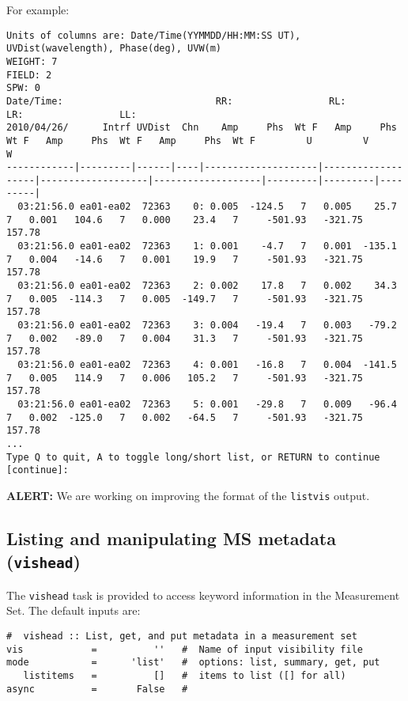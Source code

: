 For example:
\small
\begin{verbatim}
Units of columns are: Date/Time(YYMMDD/HH:MM:SS UT), UVDist(wavelength), Phase(deg), UVW(m)
WEIGHT: 7
FIELD: 2
SPW: 0
Date/Time:                           RR:                 RL:                 LR:                 LL:                                             
2010/04/26/      Intrf UVDist  Chn    Amp     Phs  Wt F   Amp     Phs  Wt F   Amp     Phs  Wt F   Amp     Phs  Wt F         U         V         W
------------|---------|------|----|--------------------|-------------------|-------------------|-------------------|---------|---------|---------|
  03:21:56.0 ea01-ea02  72363    0: 0.005  -124.5   7   0.005    25.7   7   0.001   104.6   7   0.000    23.4   7     -501.93   -321.75    157.78
  03:21:56.0 ea01-ea02  72363    1: 0.001    -4.7   7   0.001  -135.1   7   0.004   -14.6   7   0.001    19.9   7     -501.93   -321.75    157.78
  03:21:56.0 ea01-ea02  72363    2: 0.002    17.8   7   0.002    34.3   7   0.005  -114.3   7   0.005  -149.7   7     -501.93   -321.75    157.78
  03:21:56.0 ea01-ea02  72363    3: 0.004   -19.4   7   0.003   -79.2   7   0.002   -89.0   7   0.004    31.3   7     -501.93   -321.75    157.78
  03:21:56.0 ea01-ea02  72363    4: 0.001   -16.8   7   0.004  -141.5   7   0.005   114.9   7   0.006   105.2   7     -501.93   -321.75    157.78
  03:21:56.0 ea01-ea02  72363    5: 0.001   -29.8   7   0.009   -96.4   7   0.002  -125.0   7   0.002   -64.5   7     -501.93   -321.75    157.78
...
Type Q to quit, A to toggle long/short list, or RETURN to continue [continue]: 

\end{verbatim}
\normalsize

{\bf ALERT:} We are working on improving the format of the {\tt listvis} output.

\subsection{Listing and manipulating MS metadata ({\tt vishead})}
\label{section:io.vis.vishead}

The {\tt vishead} task is provided to access keyword information in
the Measurement Set.  The default inputs are:
\small
\begin{verbatim}
#  vishead :: List, get, and put metadata in a measurement set
vis            =          ''   #  Name of input visibility file
mode           =      'list'   #  options: list, summary, get, put
   listitems   =          []   #  items to list ([] for all)
async          =       False   #  
\end{verbatim}
\normalsize

